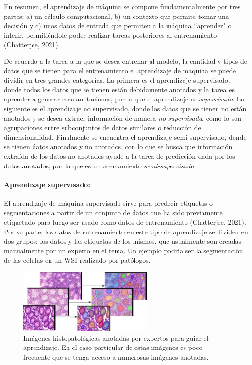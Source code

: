 \documentclass[12pt,letterpaper,final, openany]{scrbook}
\begin{document}
 En resumen, el aprendizaje de máquina se compone fundamentalmente por tres partes: a) un cálculo computacional, b) un contexto que permite tomar una decisión y c) unos datos de entrada que permiten a la máquina ``aprender" o inferir, permitiéndole poder realizar tareas posteriores al entrenamiento (Chatterjee, 2021).

De acuerdo a la tarea a la que se desea entrenar al modelo, la cantidad y tipos de datos que se tienen para el entrenamiento el aprendizaje de maquina se puede dividir en tres grandes categorías. La primera es el aprendizaje supervisado, donde todos los datos que se tienen están debidamente anotados y la tarea es aprender a generar esas anotaciones, por lo que el aprendizaje es \textit{supervisado}. La siguiente es el aprendizaje no supervisado, donde los datos que se tienen no están anotados y se desea extraer información de manera \textit{no supervisada}, como lo son agrupaciones entre subconjuntos de datos similares o reducción de dimensionalidad. Finalmente se encuentra el aprendizaje semi-supervisado, donde se tienen datos anotados y no anotados, con lo que se busca que información extraída de los datos no anotados ayude a la tarea de predicción dada por los datos anotados, por lo que es un acercamiento \textit{semi-supervisado}



\paragraph{Aprendizaje supervisado:}



El aprendizaje de máquina supervisado sirve para predecir etiquetas o segmentaciones a partir de un conjunto de datos que ha sido previamente etiquetado para luego ser usado como datos de entrenamiento (Chatterjee, 2021). Por su parte, los datos de entrenamiento en este tipo de aprendizaje se dividen en dos grupos: los datos y las etiquetas de los mismos, que usualmente son creadas manualmente por un experto en el tema. Un ejemplo podría ser la segmentación de las células en un WSI realizado por patólogos.

\begin{figure}[h!]%
    \centering
    \includegraphics[width=0.6\textwidth]{labelled.png}
   \caption{Imágenes histopatológicas anotadas por expertos para guiar el aprendizaje. En el caso particular de estas imágenes es poco frecuente que se tenga acceso a numerosas imágenes anotadas.}
    \label{fig:labelled}
\end{figure}
\end{document}
